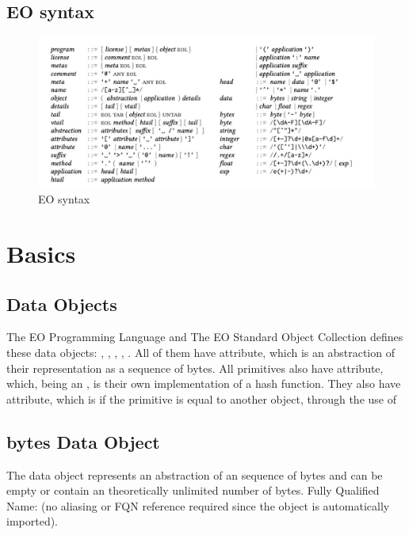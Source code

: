 \documentclass[12pt]{book}
\begin{document}
{\section{EO syntax}
\begin{figure}[ht]
  \centering
  \includegraphics[width=1\textwidth,]{EOsyntxax.jpg}
  \caption{EO syntax}
  \label{fig:uml1}
\end{figure}


\chapter{Basics}

\section{Data Objects}

The EO Programming Language and The EO Standard Object Collection defines these data objects: , , , , . All of them have  attribute, which is an abstraction of their representation as a sequence of bytes.
All primitives also have  attribute, which, being an , is their own implementation of a hash function. They also have  attribute, which is  if the primitive is equal to another object, through the use of 

\section{bytes Data Object}
The  data object represents an abstraction of an sequence of bytes and can be empty or contain an theoretically unlimited number of bytes.
Fully Qualified Name:  (no aliasing or FQN reference required since the object is automatically imported).

}
\end{document}
